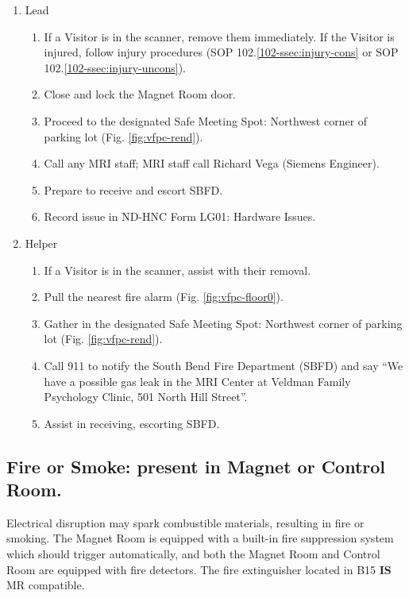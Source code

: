 \documentclass[11pt]{article}
\begin{document}
\begin{enumerate}
	\item Lead
	\begin{enumerate}
		\item If a Visitor is in the scanner, remove them immediately. If the Visitor is injured, follow injury procedures (SOP 102.\ref{102-ssec:injury-cons} or SOP 102.\ref{102-ssec:injury-uncons}).
		\item Close and lock the Magnet Room door.
		\item Proceed to the designated Safe Meeting Spot: Northwest corner of parking lot (Fig. \ref{fig:vfpc-rend}).
		\item Call any MRI staff; MRI staff call Richard Vega (Siemens Engineer).
		\item Prepare to receive and escort SBFD.
		\item Record issue in ND-HNC Form LG01: Hardware Issues.
	\end{enumerate}

	\item Helper
	\begin{enumerate}
		\item If a Visitor is in the scanner, assist with their removal.
		\item Pull the nearest fire alarm (Fig. \ref{fig:vfpc-floor0}).
		\item Gather in the designated Safe Meeting Spot: Northwest corner of parking lot (Fig. \ref{fig:vfpc-rend}).
		\item Call 911 to notify the South Bend Fire Department (SBFD) and say ``We have a possible gas leak in the MRI Center at Veldman Family Psychology Clinic, 501 North Hill Street''.
		\item Assist in receiving, escorting SBFD.
	\end{enumerate}
\end{enumerate}


\subsection{Fire or Smoke: present in Magnet or Control Room.}
\label{ssec:fire}

Electrical disruption may spark combustible materials, resulting in fire or smoking. The Magnet Room is equipped with a built-in fire suppression system which should trigger automatically, and both the Magnet Room and Control Room are equipped with fire detectors. The fire extinguisher located in B15 \textbf{IS} MR compatible.
\end{document}
